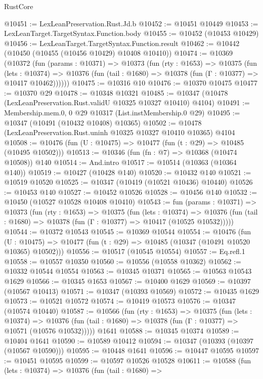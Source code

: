 \begin{lexlean}{RustCore}
\begin{coremodule}
@10451 := LexLeanPreservation.Rust.Jd.b
@10452 := @10451 @10449
@10453 := LexLeanTarget.TargetSyntax.Function.body
@10455 := @10452 (@10453 @10429)
@10456 := LexLeanTarget.TargetSyntax.Function.result
@10462 := @10442 (@10450 (@10455 (@10456 @10429) @10408 @10410))
@10474 := @10369
    (@10372
      (fun (params : @10371) =>
      @10373
        (fun (rty : @1653) =>
        @10375
          (fun (lets : @10374) =>
          @10376 (fun (tail : @1680) => @10378 (fun (Γ : @10377) => @10417 @10462))))))
@10475 := @10316 @10
@10476 := @10370 @10475
@10477 := @10370 @29
@10478 := @10348 @10321
@10485 := @10347 (@10478 (LexLeanPreservation.Rust.validU @10325 @10327 @10410) @4104)
@10491 := Membership.mem.{0, 0} @29 @10317 (List.instMembership.{0} @29)
@10495 := @10347 (@10491 (@10432 @10408) @10365)
@10502 := @10478 (LexLeanPreservation.Rust.uninh @10325 @10327 @10410 @10365) @4104
@10508 := @10476 (fun (U : @10475) => @10477 (fun (t : @29) => @10485 (@10495 @10502)))
@10513 := @10346 (fun (fn : @7) => @10368 (@10474 @10508)) @140
@10514 := And.intro
@10517 := @10514 (@10363 (@10364 @140))
@10519 := @10427 (@10428 @140)
@10520 := @10432 @140
@10521 := @10519 @10520
@10525 := @10347 (@10419 (@10521 @10436) @10440)
@10526 := @10453 @140
@10527 := @10452 @10526
@10528 := @10456 @140
@10532 := @10450 (@10527 @10528 @10408 @10410)
@10543 := fun (params : @10371) =>
  @10373
    (fun (rty : @1653) =>
    @10375
      (fun (lets : @10374) =>
      @10376 (fun (tail : @1680) => @10378 (fun (Γ : @10377) => @10417 (@10525 @10532)))))
@10544 := @10372 @10543
@10545 := @10369 @10544
@10554 := @10476
    (fun (U : @10475) => @10477 (fun (t : @29) => @10485 (@10347 (@10491 @10520 @10365) @10502)))
@10556 := @10517 (@10545 @10554)
@10557 := Eq.refl.{1}
@10558 := @10557 @10350
@10560 := @10556 (@10558 @10362)
@10562 := @10332 @10544 @10554
@10563 := @10345 @10371
@10565 := @10563 @10543 @1629
@10566 := @10345 @1653
@10567 := @10400 @1629
@10569 := @10397 (@10567 @10413)
@10571 := @10347 (@10393 @10569)
@10572 := @10435 @1629
@10573 := @10521 @10572
@10574 := @10419 @10573
@10576 := @10347 (@10574 @10440)
@10587 := @10566
    (fun (rty : @1653) =>
    @10375
      (fun (lets : @10374) =>
      @10376 (fun (tail : @1680) => @10378 (fun (Γ : @10377) => @10571 (@10576 @10532)))))
    @1641
@10588 := @10345 @10374
@10589 := @10404 @1641
@10590 := @10589 @10412
@10594 := @10347 (@10393 (@10397 (@10567 @10590)))
@10595 := @10448 @1641
@10596 := @10447 @10595
@10597 := @10451 @10595
@10599 := @10597 @10526 @10528
@10611 := @10588
    (fun (lets : @10374) =>
    @10376
      (fun (tail : @1680) =>

\end{coremodule}
\end{lexlean}
